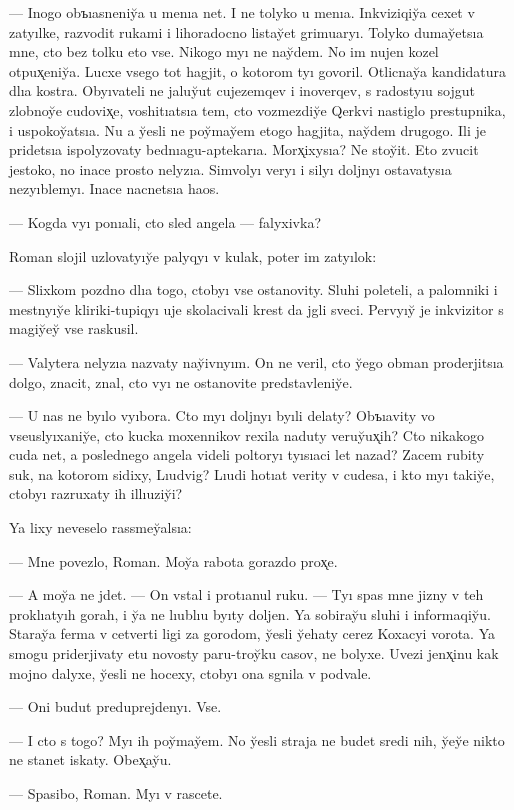 \documentclass[10pt]{book}
\begin{document}
— Inogo obъıasneniy̆a u menıa net. I ne tolyko u menıa. Inkviziqiy̆a cexet v zatyılke, razvodit rukami i lihoradocno listay̆et grimuaryı. Tolyko dumay̆etsıa mne, cto bez tolku eto vse. Nikogo myı ne nay̆dem. No im nujen kozel otpux̨eniy̆a. Lucxe vsego tot hagjit, o kotorom tyı govoril. Otlicnay̆a kandidatura dlıa kostra. Obyıvateli ne jaluy̆ut cujezemqev i inoverqev, s radostyıu sojgut zlobnoy̆e cudovix̨e, voshitıatsıa tem, cto vozmezdiy̆e Qerkvi nastiglo prestupnika, i uspokoy̆atsıa. Nu a y̆esli ne poy̆may̆em etogo hagjita, nay̆dem drugogo. Ili je pridetsıa ispolyzovaty bednıagu-aptekarıa. Morx̨ixysıa? Ne stoy̆it. Eto zvucit jestoko, no inace prosto nelyzıa. Simvolyı veryı i silyı doljnyı ostavatysıa nezyıblemyı. Inace nacnetsıa haos.

— Kogda vyı ponıali, cto sled angela — falyxivka?

Roman slojil uzlovatyıy̆e palyqyı v kulak, poter im zatyılok:

— Slixkom pozdno dlıa togo, ctobyı vse ostanovity. Sluhi poleteli, a palomniki i mestnyıy̆e kliriki-tupiqyı uje skolacivali krest da jgli sveci. Pervyıy̆ je inkvizitor s magiy̆ey̆ vse raskusil.

— Valytera nelyzıa nazvaty nay̆ivnyım. On ne veril, cto y̆ego obman proderjitsıa dolgo, znacit, znal, cto vyı ne ostanovite predstavleniy̆e.

— U nas ne byılo vyıbora. Cto myı doljnyı byıli delaty? Obъıavity vo vseuslyıxaniy̆e, cto kucka moxennikov rexila naduty veruy̆ux̨ih? Cto nikakogo cuda net, a poslednego angela videli poltoryı tyısıaci let nazad? Zacem rubity suk, na kotorom sidixy, Lıudvig? Lıudi hotıat verity v cudesa, i kto myı takiy̆e, ctobyı razruxaty ih illıuziy̆i?

Ya lixy neveselo rassmey̆alsıa:

— Mne povezlo, Roman. Moy̆a rabota gorazdo prox̨e.

— A moy̆a ne jdet. — On vstal i protıanul ruku. — Tyı spas mne jizny v teh proklıatyıh gorah, i y̆a ne lıublıu byıty doljen. Ya sobiray̆u sluhi i informaqiy̆u. Staray̆a ferma v cetverti ligi za gorodom, y̆esli y̆ehaty cerez Koxacyi vorota. Ya smogu priderjivaty etu novosty paru-troy̆ku casov, ne bolyxe. Uvezi jenx̨inu kak mojno dalyxe, y̆esli ne hocexy, ctobyı ona sgnila v podvale.

— Oni budut preduprejdenyı. Vse.

— I cto s togo? Myı ih poy̆may̆em. No y̆esli straja ne budet sredi nih, y̆ey̆e nikto ne stanet iskaty. Obex̨ay̆u.

— Spasibo, Roman. Myı v rascete.
\end{document}
